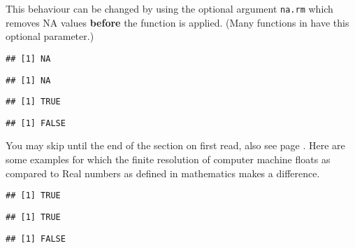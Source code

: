 \documentclass[paper=a4,10pt,div=17,headsepline,BCOR=12mm,twoside,open=right]{scrbook}\usepackage{knitr}
\begin{document}
This behaviour can be changed by using the optional argument \texttt{na.rm} which removes NA values \textbf{before} the function is applied. (Many functions in \R have this optional parameter.)

\begin{knitrout}\footnotesize
{}\color{fgcolor}\begin{kframe}
\begin{alltt}
 \hlopt{<} \hlstd{)}
\end{alltt}
\begin{verbatim}
## [1] NA
\end{verbatim}
\begin{alltt}
 \hlopt{>} \hlstd{)}
\end{alltt}
\begin{verbatim}
## [1] NA
\end{verbatim}
\begin{alltt}
 \hlopt{<} \hlstd{,} \hlstd{=}\hlstd{)}
\end{alltt}
\begin{verbatim}
## [1] TRUE
\end{verbatim}
\begin{alltt}
 \hlopt{>} \hlstd{,} \hlstd{=}\hlstd{)}
\end{alltt}
\begin{verbatim}
## [1] FALSE
\end{verbatim}
\end{kframe}
\end{knitrout}

You may skip until the end of the section on first read, also see page \pageref{par:float}. Here are some examples for which the finite resolution of computer machine floats as compared to Real numbers as defined in mathematics makes a difference. 

\begin{knitrout}\footnotesize
{}\color{fgcolor}\begin{kframe}
\begin{alltt}
 \hlopt{==}  \hlopt{+} 
\end{alltt}
\begin{verbatim}
## [1] TRUE
\end{verbatim}
\begin{alltt}
 \hlopt{==}  \hlopt{+} 
\end{alltt}
\begin{verbatim}
## [1] TRUE
\end{verbatim}
\begin{alltt}
 \hlopt{==} 
\end{alltt}
\begin{verbatim}
## [1] FALSE
\end{verbatim}
\end{kframe}
\end{knitrout}
\end{document}

